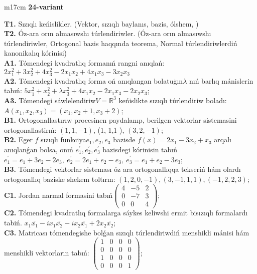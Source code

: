 \documentclass{article}
\begin{document}
\begin{tabular}{m{17cm}}
\textbf{24-variant}
\newline

\textbf{T1.} Sızıqlı keńislikler.   (Vektor,  sızıqlı baylanıs, bazis, ólshem, )  \\
\textbf{T2.} Óz-ara orın almasıwshı túrlendiriwler. (Óz-ara orın almasıwshı túrlendiriwler,  Ortogonal bazis haqqında teorema,  Normal túrlendiriwlerdiń kanonikalıq kórinisi) \\
\textbf{A1.} Tómendegi kvadratlıq formanıń rangni anıqlań: \(2x_{1}^{2} + 3x_{2}^{2} + 4x_{3}^{2} - 2x_{1}x_{2} + 4x_{1}x_{3} - 3x_{2}x_{3}\) \\
\textbf{A2.} Tómendegi kvadratlıq forma oń anıqlangan bolatuģın\(\lambda\) nıń barlıq mánislerin tabıń: \(5x_{1}^{2} + x_{2}^{2} + \lambda x_{3}^{2} + 4x_{1}x_{2} - 2x_{1}x_{3} - 2x_{2}x_{3}\); \\
\textbf{A3.} Tómendegi sáwlelendiriw\(V = \mathbb{R}^{3}\) keńislikte sızıqlı túrlendiriw boladı: \(A\left( x_{1},x_{2},x_{3} \right) = \left( x_{1},x_{2} + 1,x_{3} + 2 \right)\); \\
\textbf{B1.} Ortogonallastırıw procesinen paydalanıp, berilgen vektorlar sistemasini ortogonallastirıń: \((1,1, - 1)\), (1, 1,1 ), \((3,2, - 1)\); \\
\textbf{B2.} Eger \(f\) sızıqlı funkciya\(e_{1},e_{2},e_{3}\) bazisde \(f(x) = 2x_{1} - 3x_{2} + x_{3}\) arqalı anıqlanǵan bolsa, onıń \(e_{1}^{'},e_{2}^{'},e_{3}^{'}\) bazisdegi kórinisin tabıń\(e_{1}^{'} = e_{1} + 3e_{2} - 2e_{3},\ e_{2}^{'} = 2e_{1} + e_{2} - e_{3},\ e_{3}^{'} = e_{1} + e_{2} - 3e_{3}\); \\
\textbf{B3.} Tómendegi vektorlar sisteması óz ara ortogonallıqqa tekseriń hám olardı ortogonallıq baziske shekem toltırın: \((1,2,0, - 1),(3, - 1,1,1),( - 1,2,2,3)\); \\
\textbf{C1.} Jordan narmal formasini tabıń\(\begin{pmatrix} 4 & - 5 & 2 \\ 0 & - 7 & 3 \\ 0 & 0 & 4 \end{pmatrix}\); \\
\textbf{C2.} Tómendegi kvadratlıq formalarga sáykes keliwshi ermit bisızıqlı formalardı tabiń. \(x_{1}\overline{x_{1}} - ix_{1}\overline{x_{2}} - ix_{2}\overline{x_{1}} + 2x_{2}\overline{x_{2}}\); \\
\textbf{C3.} Matricası tómendegishe bolǵan sızıqlı túrlendiriwdiń menshikli mánisi hám menshikli vektorların tabıń: \(\begin{pmatrix} 1 & 0 & 0 & 0 \\ 0 & 0 & 0 & 0 \\ 1 & 0 & 0 & 0 \\ 0 & 0 & 0 & 1 \end{pmatrix}\); \\

\end{tabular}
\vspace{1cm}
\end{document}
